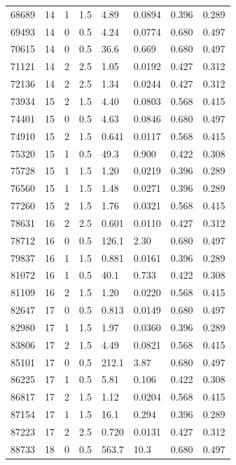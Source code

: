 \documentclass[preview]{standalone}
\begin{document}
{{{\begin{tabular}{L{1.2cm}C{1.2cm} C{0.3cm}C{0.5cm} C{1.4cm}C{1.4cm} C{1.4cm}C{1.4cm}}
  68689  &    14  & 1     & 1.5 &  4.89  & 0.0894  & 0.396 &  0.289   \\ 
  69493  &    14  & 0     & 0.5 &  4.24  & 0.0774  & 0.680 &  0.497   \\ 
  70615  &    14  & 0     & 0.5 &  36.6  & 0.669  & 0.680 &  0.497   \\ 
  71121  &    14  & 2     & 2.5 &  1.05  & 0.0192  & 0.427 &  0.312   \\ 
  72136  &    14  & 2     & 2.5 &  1.34  & 0.0244  & 0.427 &  0.312   \\ 
  73934  &    15  & 2     & 1.5 &  4.40  & 0.0803  & 0.568 &  0.415   \\ 
  74401  &    15  & 0     & 0.5 &  4.63  & 0.0846  & 0.680 &  0.497   \\ 
  74910  &    15  & 2     & 1.5 &  0.641  & 0.0117  & 0.568 &  0.415   \\ 
  75320  &    15  & 1     & 0.5 &  49.3  & 0.900  & 0.422 &  0.308   \\ 
  75728  &    15  & 1     & 1.5 &  1.20  & 0.0219  & 0.396 &  0.289   \\ 
  76560  &    15  & 1     & 1.5 &  1.48  & 0.0271  & 0.396 &  0.289   \\ 
  77260  &    15  & 2     & 1.5 &  1.76  & 0.0321  & 0.568 &  0.415   \\ 
  78631  &    16  & 2     & 2.5 &  0.601  & 0.0110  & 0.427 &  0.312   \\ 
  78712  &    16  & 0     & 0.5 &  126.1  & 2.30  & 0.680 &  0.497   \\ 
  79837  &    16  & 1     & 1.5 &  0.881  & 0.0161  & 0.396 &  0.289   \\ 
  81072  &    16  & 1     & 0.5 &  40.1  & 0.733  & 0.422 &  0.308   \\ 
  81109  &    16  & 2     & 1.5 &  1.20  & 0.0220  & 0.568 &  0.415   \\ 
  82647  &    17  & 0     & 0.5 &  0.813  & 0.0149  & 0.680 &  0.497   \\ 
  82980  &    17  & 1     & 1.5 &  1.97  & 0.0360  & 0.396 &  0.289   \\ 
  83806  &    17  & 2     & 1.5 &  4.49  & 0.0821  & 0.568 &  0.415   \\ 
  85101  &    17  & 0     & 0.5 &  212.1  & 3.87  & 0.680 &  0.497   \\ 
  86225  &    17  & 1     & 0.5 &  5.81  & 0.106  & 0.422 &  0.308   \\ 
  86817  &    17  & 2     & 1.5 &  1.12  & 0.0204  & 0.568 &  0.415   \\ 
  87154  &    17  & 1     & 1.5 &  16.1  & 0.294  & 0.396 &  0.289   \\ 
  87223  &    17  & 2     & 2.5 &  0.720  & 0.0131  & 0.427 &  0.312   \\ 
  88733  &    18  & 0     & 0.5 &  563.7  & 10.3  & 0.680 &  0.497   \\ 
\hline 
\end{tabular} 

}}}
\end{document}
